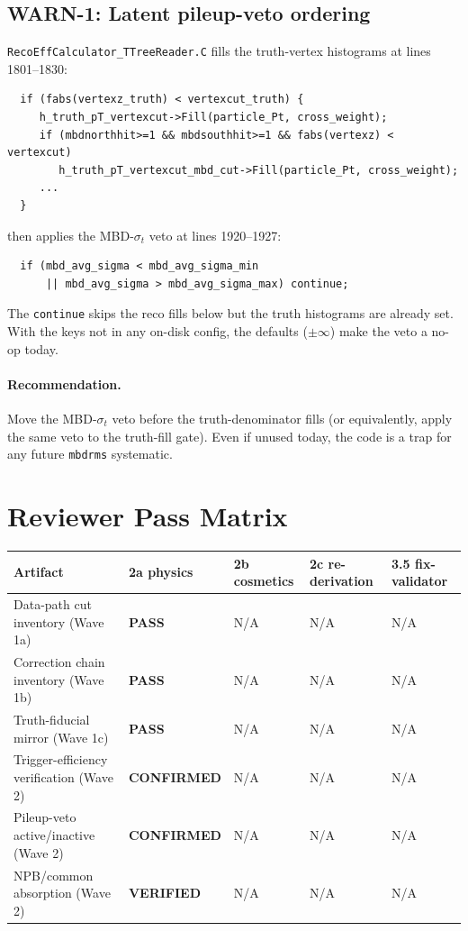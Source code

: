 \documentclass[11pt,a4paper]{article}
\newcommand{\ok}[1]{\textcolor{green!50!black}{\textbf{#1}}}
\begin{document}
\subsection{WARN-1: Latent pileup-veto ordering}

\texttt{RecoEffCalculator\_TTreeReader.C} fills the truth-vertex
histograms at lines 1801--1830:
\begin{verbatim}
  if (fabs(vertexz_truth) < vertexcut_truth) {
     h_truth_pT_vertexcut->Fill(particle_Pt, cross_weight);
     if (mbdnorthhit>=1 && mbdsouthhit>=1 && fabs(vertexz) < vertexcut)
        h_truth_pT_vertexcut_mbd_cut->Fill(particle_Pt, cross_weight);
     ...
  }
\end{verbatim}
then applies the MBD-$\sigma_t$ veto at lines 1920--1927:
\begin{verbatim}
  if (mbd_avg_sigma < mbd_avg_sigma_min
      || mbd_avg_sigma > mbd_avg_sigma_max) continue;
\end{verbatim}
The \texttt{continue} skips the reco fills below but the truth
histograms are already set. With the keys not in any on-disk config,
the defaults ($\pm\infty$) make the veto a no-op today.

\paragraph{Recommendation.} Move the MBD-$\sigma_t$ veto before the
truth-denominator fills (or equivalently, apply the same veto to the
truth-fill gate). Even if unused today, the code is a trap for any
future \texttt{mbdrms} systematic.

\section{Reviewer Pass Matrix}

\begin{longtable}{@{}p{3.0cm}p{2.2cm}p{2.2cm}p{2.4cm}p{2.6cm}@{}}
\toprule
Artifact & 2a physics & 2b cosmetics & 2c re-derivation & 3.5 fix-validator \\
\midrule
Data-path cut inventory (Wave 1a) & \ok{PASS} & N/A & N/A & N/A \\
Correction chain inventory (Wave 1b) & \ok{PASS} & N/A & N/A & N/A \\
Truth-fiducial mirror (Wave 1c) & \ok{PASS} & N/A & N/A & N/A \\
Trigger-efficiency verification (Wave 2) & \ok{CONFIRMED} & N/A & N/A & N/A \\
Pileup-veto active/inactive (Wave 2) & \ok{CONFIRMED} & N/A & N/A & N/A \\
NPB/common absorption (Wave 2) & \ok{VERIFIED} & N/A & N/A & N/A \\
\bottomrule
\end{longtable}
\end{document}
